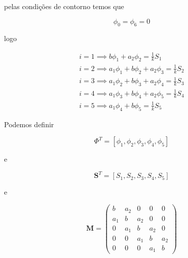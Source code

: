 \documentclass{article}
\begin{document}
                pelas condições de contorno temos que

                \begin{equation}
                    \phi_0 = \phi_6 = 0
                \end{equation}

                logo

                \begin{eqnarray}
                    i=1 \implies b \phi_1 + a_2 \phi_2 = \frac{1}{k} S_1 \nonumber \\
                    i=2 \implies a_1 \phi_1 + b \phi_2 + a_2 \phi_3 = \frac{1}{k} S_2 \nonumber \\
                    i=3 \implies a_1 \phi_2 + b \phi_3 + a_2 \phi_4 = \frac{1}{k} S_3 \nonumber \\
                    i=4 \implies a_1 \phi_3 + b \phi_4 + a_2 \phi_5 = \frac{1}{k} S_4 \nonumber \\
                    i=5 \implies a_1 \phi_4 + b \phi_5 = \frac{1}{k} S_5
                \end{eqnarray}

                Podemos definir

                \begin{equation}
                    \Phi^T = [ \phi_1,\phi_2,\phi_3,\phi_4,\phi_5]
                \end{equation}

                e

                \begin{equation}
                    \textbf{S}^T = [ S_1,S_2,S_3,S_4,S_5]
                \end{equation}

                e

                \begin{displaymath}
                    \mathbf{\textbf{M}}=\left(\begin{array}{ccccc}
                    b   & a_2 & 0   & 0   & 0   \\
                    a_1 & b   & a_2 & 0   & 0   \\
                    0   & a_1 & b   & a_2 & 0   \\
                    0   & 0   & a_1 & b   & a_2 \\
                    0   & 0   & 0   & a_1 & b
                    \end{array}\right)
                \end{displaymath}
\end{document}
